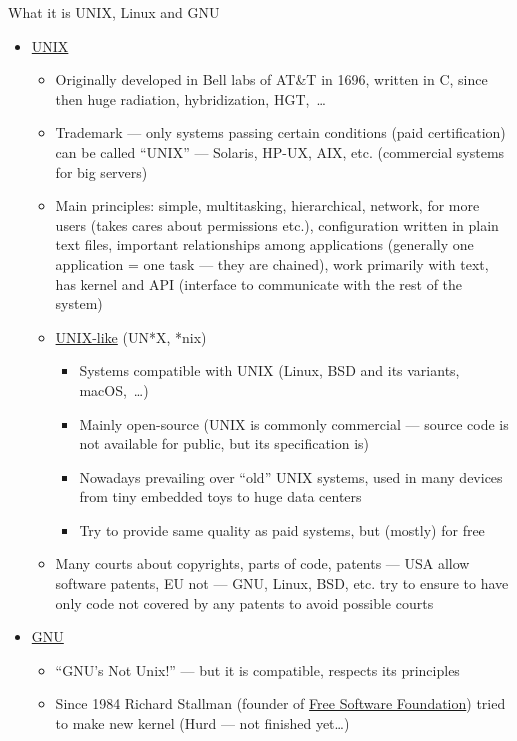 \documentclass[compress, ucs, xelatex, 11pt, xcolor=svgnames,
  hyperref={
    bookmarks=true,
    unicode=true,
    colorlinks=true,
    pdftitle={Linux, command line and MetaCentrum},
    plainpages=false,
    pdfauthor={Vojtech Zeisek},
    pdfsubject={Course about use of Linux command line, writing shell scripts and using MetaCentrum of CESNET},
    pdfcreator={XeLaTeX},
    pdfkeywords={Linux, GNU, BASH, shell, command line, MetaCentrum},
    linkcolor=DarkRed,
    anchorcolor=DarkBlue,
    citecolor=Indigo,
    filecolor=NavyBlue,
    menucolor=DarkMagenta,
    urlcolor=DarkBlue,
    pdftex},
  url={hyphens, lowtilde} %
  ]{beamer}
\begin{document}
\begin{frame}[allowframebreaks]{What it is UNIX, Linux and GNU}
  \begin{itemize}
    \item \href{https://en.wikipedia.org/wiki/Unix}{UNIX}
    \begin{itemize}
      \item Originally developed in Bell labs of AT\&T in 1696, written in C, since then  huge radiation, hybridization, HGT,~\ldots
      \item Trademark --- only systems passing certain conditions (paid certification) can be called ``UNIX'' --- Solaris, HP-UX, AIX, etc. (commercial systems for big servers)
      \item Main principles: simple, multitasking, hierarchical, network, for more users (takes cares about permissions etc.), configuration written in plain text files, important relationships among applications (generally one application = one task --- they are chained), work primarily with text, has kernel and API (interface to communicate with the rest of the system)
      \item \href{https://en.wikipedia.org/wiki/Unix-like}{UNIX-like} (UN*X, *nix)
      \begin{itemize}
	\item Systems compatible with UNIX (Linux, BSD and its variants, macOS,~\ldots)
	\item Mainly open-source (UNIX is commonly commercial --- source code is not available for public, but its specification is)
	\item Nowadays prevailing over ``old'' UNIX systems, used in many devices from tiny embedded toys to huge data centers
	\item Try to provide same quality as paid systems, but (mostly) for free
      \end{itemize}
      \item Many courts about copyrights, parts of code, patents --- USA allow software patents, EU not --- GNU, Linux, BSD, etc. try to ensure to have only code not covered by any patents to avoid possible courts
    \end{itemize}
    \item \href{https://www.gnu.org/}{GNU}
    \begin{itemize}
      \item ``GNU's Not Unix!'' --- but it is compatible, respects its principles
      \item Since 1984 Richard Stallman (founder of \href{https://www.fsf.org/}{Free Software Foundation}) tried to make new kernel (Hurd --- not finished yet\ldots)

\end{itemize}
\end{itemize}
\end{frame}
\end{document}
